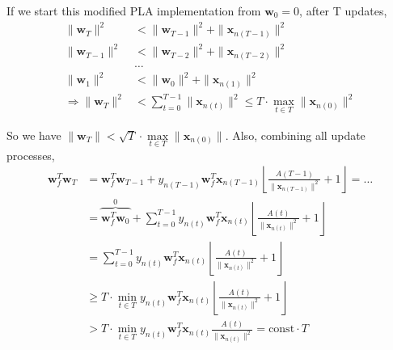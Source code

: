 If we start this modified PLA implementation from $\mathbf{w}_0 = 0$, after T updates,
\begin{align*}
\|\mathbf{w}_T\|^2 &< \|\mathbf{w}_{T-1}\|^2 + \|\mathbf{x}_{n(T-1)}\|^2\\
\|\mathbf{w}_{T-1}\|^2 &< \|\mathbf{w}_{T-2}\|^2 + \|\mathbf{x}_{n(T-2)}\|^2\\
&\ldots\\
\|\mathbf{w}_{1}\|^2 &< \|\mathbf{w}_0\|^2 + \|\mathbf{x}_{n(1)}\|^2\\
\Rightarrow \|\mathbf{w}_T\|^2 &< \sum^{T-1}_{t=0}\|\mathbf{x}_{n(t)}\|^2
    \leq T \cdot \max_{t\in T}\|\mathbf{x}_{n(0)}\|^2
\end{align*}

So we have $\|\mathbf{w}_T\| < \sqrt{T} \cdot \max\limits_{t\in T}\|\mathbf{x}_{n(0)}\|$. Also, combining all update processes,
\begin{align*}
\mathbf{w}_f^T\mathbf{w}_T
&= \mathbf{w}_f^T\mathbf{w}_{T-1} + y_{n(T-1)}\mathbf{w}_f^T\mathbf{x}_{n(T-1)}\left\lfloor
    \frac{A(T-1)}{\|\mathbf{x}_{n(T-1)}\|^2} + 1
\right\rfloor = \ldots \\
&= \overbrace{\mathbf{w}_f^T\mathbf{w}_0}^{0} + \sum^{T-1}_{t=0} y_{n(t)}\mathbf{w}_f^T\mathbf{x}_{n(t)} \left\lfloor
    \frac{A(t)}{\|\mathbf{x}_{n(t)}\|^2} + 1
\right\rfloor\\
&= \sum^{T-1}_{t=0} y_{n(t)}\mathbf{w}_f^T\mathbf{x}_{n(t)} \left\lfloor
    \frac{A(t)}{\|\mathbf{x}_{n(t)}\|^2} + 1
\right\rfloor\\
&\geq T \cdot \min_{t \in T} y_{n(t)}\mathbf{w}_f^T\mathbf{x}_{n(t)} \left\lfloor
    \frac{A(t)}{\|\mathbf{x}_{n(t)}\|^2} + 1
\right\rfloor\\
&> T \cdot \min_{t \in T} y_{n(t)}\mathbf{w}_f^T\mathbf{x}_{n(t)} \frac{A(t)}{\|\mathbf{x}_{n(t)}\|^2} = \text{const} \cdot T
\end{align*}

